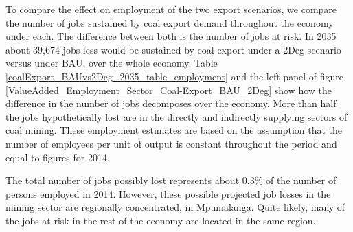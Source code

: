 \documentclass[12pt,english]{article}
\begin{document}

To compare the effect on employment of the two export scenarios, we compare the number of jobs sustained by coal export demand throughout the economy under each. The difference between both is the number of jobs at risk.
In 2035 about 39,674 jobs less would be sustained by coal export under a 2Deg scenario versus under BAU, over the whole economy. Table \ref{coalExport_BAUvs2Deg_2035_table_employment} and the left panel of figure \ref{ValueAdded_Employment_Sector_Coal-Export_BAU_2Deg} show how the difference in the number of jobs decomposes over the economy. More than half the jobs hypothetically lost are in the directly and indirectly supplying sectors of coal mining. These employment estimates are based on the assumption that the number of employees per unit of output is constant throughout the period and equal to figures for 2014. 

The total number of jobs possibly lost represents about 0.3\% of the number of persons employed in 2014. However, these possible projected job losses in the mining sector are regionally concentrated, in Mpumalanga. Quite likely, many of the jobs at risk in the rest of the economy are located in the same region.
\end{document}

